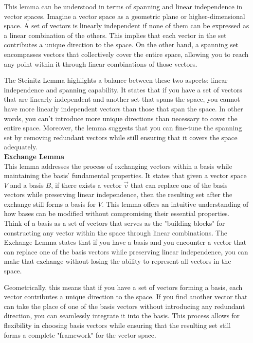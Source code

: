 This lemma can be understood in terms of spanning and linear independence in vector spaces. Imagine a vector space as a geometric plane or higher-dimensional space. A set of vectors is linearly independent if none of them can be expressed as a linear combination of the others. This implies that each vector in the set contributes a unique direction to the space. On the other hand, a spanning set encompasses vectors that collectively cover the entire space, allowing you to reach any point within it through linear combinations of those vectors.

The Steinitz Lemma highlights a balance between these two aspects: linear independence and spanning capability. It states that if you have a set of vectors that are linearly independent and another set that spans the space, you cannot have more linearly independent vectors than those that span the space. In other words, you can't introduce more unique directions than necessary to cover the entire space. Moreover, the lemma suggests that you can fine-tune the spanning set by removing redundant vectors while still ensuring that it covers the space adequately.
\\

\textbf{Exchange Lemma}\\
This lemma addresses the process of exchanging vectors within a basis while maintaining the basis' fundamental properties. It states that given a vector space $V$ and a basis $B$, if there exists a vector $\vec{v}$ that can replace one of the basis vectors while preserving linear independence, then the resulting set after the exchange still forms a basis for $V$. This lemma offers an intuitive understanding of how bases can be modified without compromising their essential properties. Think of a basis as a set of vectors that serves as the "building blocks" for constructing any vector within the space through linear combinations. The Exchange Lemma states that if you have a basis and you encounter a vector that can replace one of the basis vectors while preserving linear independence, you can make that exchange without losing the ability to represent all vectors in the space.

Geometrically, this means that if you have a set of vectors forming a basis, each vector contributes a unique direction to the space. If you find another vector that can take the place of one of the basis vectors without introducing any redundant direction, you can seamlessly integrate it into the basis. This process allows for flexibility in choosing basis vectors while ensuring that the resulting set still forms a complete "framework" for the vector space.
\\


